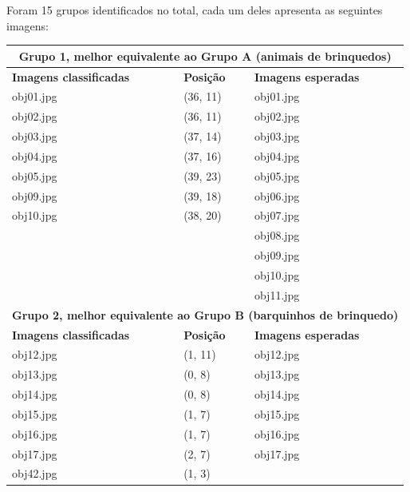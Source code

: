 Foram 15 grupos identificados no total, cada um deles apresenta as seguintes
imagens:

\begin{center}
  \begin{longtable}{|l|l|l|}
    \hline
    \multicolumn{3}{|c|}{\textbf{Grupo 1, melhor equivalente ao Grupo A (animais
      de brinquedos)}} \\
    \hline\hline
    \textbf{Imagens classificadas} & \textbf{Posição} & \textbf{Imagens esperadas} \\
    \hline\hline
    obj01.jpg & (36, 11) & obj01.jpg \\
    \hline
    obj02.jpg & (36, 11) & obj02.jpg \\
    \hline
    obj03.jpg & (37, 14) & obj03.jpg \\
    \hline
    obj04.jpg & (37, 16) & obj04.jpg \\
    \hline
    obj05.jpg & (39, 23) & obj05.jpg \\
    \hline
    obj09.jpg & (39, 18) & obj06.jpg \\
    \hline
    obj10.jpg & (38, 20) & obj07.jpg \\
    \hline
                        && obj08.jpg \\
    \hline
                        && obj09.jpg \\
    \hline
                        && obj10.jpg \\
    \hline
                        && obj11.jpg \\
    \hline\hline

    \multicolumn{3}{|c|}{\textbf{Grupo 2, melhor equivalente ao Grupo B
      (barquinhos de brinquedo)}} \\
    \hline\hline
    \textbf{Imagens classificadas} & \textbf{Posição} & \textbf{Imagens esperadas} \\
    \hline\hline

    obj12.jpg & (1, 11) & obj12.jpg \\
    \hline
    obj13.jpg & (0, 8)  & obj13.jpg \\
    \hline
    obj14.jpg & (0, 8)  & obj14.jpg \\
    \hline
    obj15.jpg & (1, 7)  & obj15.jpg \\
    \hline
    obj16.jpg & (1, 7)  & obj16.jpg \\
    \hline
    obj17.jpg & (2, 7)  & obj17.jpg \\
    \hline
    obj42.jpg & (1, 3)  & \\
    \hline\hline


\end{longtable}
\end{center}
